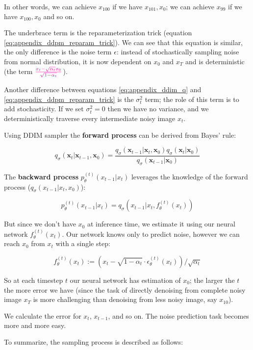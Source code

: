 In other words, we can achieve $x_100$ if we have $x_101, x_0$; we can achieve $x_99$ if we have $x_100, x_0$ and so on.

The underbrace term is the reparameterization trick (equation \ref{eq:appendix_ddpm_reparam_trick}). We can see that this equation is similar, the only difference is the noise term $\epsilon$: instead of stochastically sampling noise from normal distribution, it is now dependent on $x_0$ and $x_T$ and is deterministic (the term $\textcolor{magenta}{\frac{x_t - \sqrt{\alpha_t} x_0}{\sqrt{1 - \alpha_t}}}$).

Another difference between equations \ref{eq:appendix_ddim_q} and \ref{eq:appendix_ddpm_reparam_trick} is the $\sigma_t^2$ term; the role of this term is to add stochasticity. If we set $\sigma_t^2 = 0$ then we have no variance, and we deterministically traverse every intermediate noisy image $x_t$.

Using DDIM sampler the \textbf{forward process} can be derived from Bayes' rule:

\[ q_{\sigma}(\mathbf{x}_t | \mathbf{x}_{t-1}, \mathbf{x}_0) = \frac{q_{\sigma}(\mathbf{x}_{t-1} | \mathbf{x}_t, \mathbf{x}_0) q_{\sigma}(\mathbf{x}_t | \mathbf{x}_0)}{q_{\sigma}(\mathbf{x}_{t-1} | \mathbf{x}_0)} \]

The \textbf{backward process} $p_\theta^{(t)} (x_{t-1} | x_t)$ leverages the knowledge of the forward process ($q_\sigma (x_{t-1} | x_t, x_0)$):

\[ p_\theta^{(t)} (x_{t-1} | x_t) = q_\sigma (x_{t-1} | x_t, f_\theta^{(t)} (x_t)) \]

But since we don't have $x_0$ at inference time, we estimate it using our neural network $f_\theta^{(t)} (x_t)$. Our network knows only to predict noise, however we can reach $x_0$ from $x_t$ with a single step:

\[ f_\theta^{(t)} (x_t) := \left( x_t - \sqrt{1 - \alpha_t} \cdot \epsilon_\theta^{(t)} (x_t) \right) / \sqrt{\alpha_t} \]

So at each timestep $t$ our neural network has estimation of $x_0$; the larger the $t$ the more error we have (since the task of directly denoising from complete noisy image $x_T$ is more challenging than denoising from less noisy image, say $x_{10}$).

We calculate the error for $x_t$, $x_{t-1}$, and so on. The noise prediction task becomes more and more easy.

To summarize, the sampling process is described as follows:


